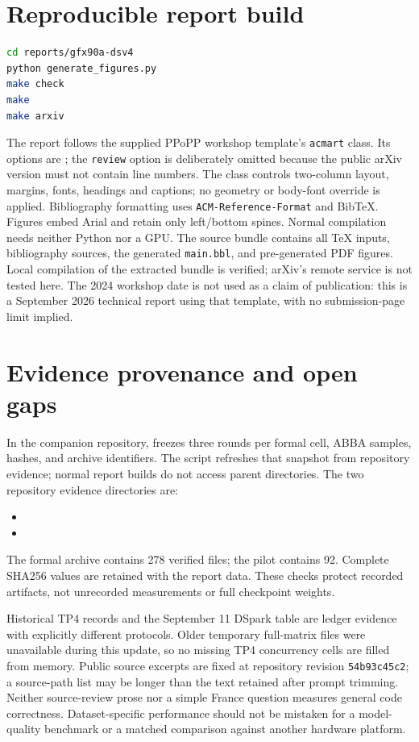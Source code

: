 \documentclass[sigplan,10pt]{acmart}
\newcommand{\commit}[1]{\texttt{#1}}
\begin{document}
\section{Reproducible report build}

\begin{lstlisting}[language=bash]
cd reports/gfx90a-dsv4
python generate_figures.py
make check
make
make arxiv
\end{lstlisting}

The report follows the supplied PPoPP workshop template's
\texttt{acmart} class. Its options are ; the
\texttt{review} option is deliberately omitted because the public arXiv
version must not contain line numbers. The class controls two-column layout,
margins, fonts, headings and captions;
no geometry or body-font override is applied. Bibliography formatting uses
\texttt{ACM-Reference-Format} and BibTeX. Figures embed Arial and retain only
left/bottom spines. Normal compilation needs neither Python nor a GPU.
The source bundle contains all TeX inputs, bibliography sources, the generated
\texttt{main.bbl}, and pre-generated PDF figures. Local compilation of the
extracted bundle is verified; arXiv's remote service is not tested here.
The 2024 workshop date is not used as a claim of publication: this is a
September 2026 technical report using that template, with no submission-page
limit implied.

\section{Evidence provenance and open gaps}

In the companion repository,  freezes three rounds per
formal cell, ABBA samples, hashes, and archive identifiers. The script
 refreshes that snapshot from repository evidence;
normal report builds do not access parent directories. The two repository
evidence directories are:
\begin{itemize}
  \item {}
  \item {}
\end{itemize}
The formal archive contains 278 verified files; the pilot contains 92. Complete SHA256 values are retained with the report data. These checks protect recorded artifacts, not unrecorded measurements or full checkpoint weights.

Historical TP4 records and the September 11 DSpark table are ledger evidence with explicitly different protocols. Older temporary full-matrix files were unavailable during this update, so no missing TP4 concurrency cells are filled from memory. Public source excerpts are fixed at repository revision \commit{54b93c45c2}; a source-path list may be longer than the text retained after prompt trimming. Neither source-review prose nor a simple France question measures general code correctness. Dataset-specific performance should not be mistaken for a model-quality benchmark or a matched comparison against another hardware platform.
\end{document}
